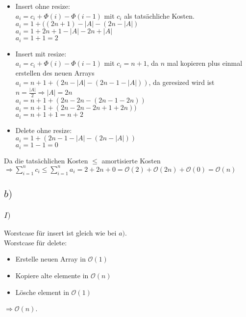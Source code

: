 \documentclass[a4paper]{scrartcl}
\begin{document}
\begin{itemize}
	\item Insert ohne resize:\\
		$a_i = c_i + \Phi(i) - \Phi(i-1)$ mit $c_i$ als tatsächliche Kosten.\\
		$a_i = 1 + ((2n+1) - |A| - (2n - |A|)$\\
		$a_i = 1 + 2n+1 - |A| -2n + |A|$\\
		$a_i = 1 + 1 = 2$
	\item  Insert mit resize:\\
		$a_i = c_i + \Phi(i) - \Phi(i-1)$ mit $c_i = n +1$, da $n$ mal kopieren plus einmal erstellen des neuen Arrays\\
		$a_i = n+1 + (2n-|A| - (2n-1-|A|))$, da geresized wird ist $n = \frac{|A|}{2} \Rightarrow |A|=2n$\\
		$a_i = n+1+ (2n - 2n - (2n - 1 -2n))$\\
		$a_i = n+1+ (2n - 2n - 2n + 1 +2n))$\\
		$a_i = n+1 + 1 = n+2$
	\item Delete ohne resize:\\
		$a_i = 1 + (2n-1-|A| - (2n - |A|))$\\
		$a_i = 1 -1 = 0$\\
\end{itemize}
Da die tatsächlichen Kosten $\leq$ amortisierte Kosten\\
$\Rightarrow \sum_{i=1}^{n} c_i \le \sum_{i=1}^{n} a_i = 2+2n+0 = \mathcal{O}(2) + \mathcal{O}(2n) + \mathcal{O}(0) = \mathcal{O}(n)$

\subsection*{$b)$}
\subsubsection*{$I)$}
Worstcase für insert ist gleich wie bei $a)$.\\
Worstcase für delete:
\begin{itemize}
	\item Erstelle neuen Array in $\mathcal{O}(1)$
	\item Kopiere alte elemente in $\mathcal{O}(n)$
	\item Lösche element in $\mathcal{O}(1)$
\end{itemize}
$\Rightarrow \mathcal{O}(n)$.
\end{document}
